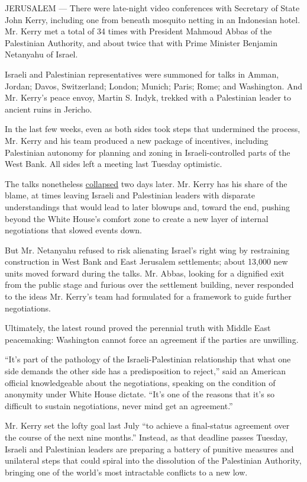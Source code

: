 JERUSALEM --- There were late-night video conferences with Secretary of
State John Kerry, including one from beneath mosquito netting in an
Indonesian hotel. Mr. Kerry met a total of 34 times with President
Mahmoud Abbas of the Palestinian Authority, and about twice that with
Prime Minister Benjamin Netanyahu of Israel.

Israeli and Palestinian representatives were summoned for talks in
Amman, Jordan; Davos, Switzerland; London; Munich; Paris; Rome; and
Washington. And Mr. Kerry's peace envoy, Martin S. Indyk, trekked with a
Palestinian leader to ancient ruins in Jericho.

In the last few weeks, even as both sides took steps that undermined the
process, Mr. Kerry and his team produced a new package of incentives,
including Palestinian autonomy for planning and zoning in
Israeli-controlled parts of the West Bank. All sides left a meeting last
Tuesday optimistic.

The talks nonetheless
\href{http://www.nytimes.com/2014/04/26/world/middleeast/collapse-of-peace-talks-leaves-israel-in-precarious-position.html?hpw\&rref=world}{collapsed}
two days later. Mr. Kerry has his share of the blame, at times leaving
Israeli and Palestinian leaders with disparate understandings that would
lead to later blowups and, toward the end, pushing beyond the White
House's comfort zone to create a new layer of internal negotiations that
slowed events down.

But Mr. Netanyahu refused to risk alienating Israel's right wing by
restraining construction in West Bank and East Jerusalem settlements;
about 13,000 new units moved forward during the talks. Mr. Abbas,
looking for a dignified exit from the public stage and furious over the
settlement building, never responded to the ideas Mr. Kerry's team had
formulated for a framework to guide further negotiations.

Ultimately, the latest round proved the perennial truth with Middle East
peacemaking: Washington cannot force an agreement if the parties are
unwilling.

``It's part of the pathology of the Israeli-Palestinian relationship
that what one side demands the other side has a predisposition to
reject,'' said an American official knowledgeable about the
negotiations, speaking on the condition of anonymity under White House
dictate. ``It's one of the reasons that it's so difficult to sustain
negotiations, never mind get an agreement.''

Mr. Kerry set the lofty goal last July ``to achieve a final-status
agreement over the course of the next nine months.'' Instead, as that
deadline passes Tuesday, Israeli and Palestinian leaders are preparing a
battery of punitive measures and unilateral steps that could spiral into
the dissolution of the Palestinian Authority, bringing one of the
world's most intractable conflicts to a new low.

